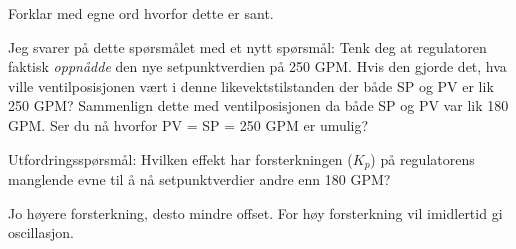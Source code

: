 Forklar med egne ord hvorfor dette er sant.







Jeg svarer på dette spørsmålet med et nytt spørsmål: Tenk deg at regulatoren faktisk {\it oppnådde} den nye setpunktverdien på 250 GPM. Hvis den gjorde det, hva ville ventilposisjonen vært i denne likevektstilstanden der både SP og PV er lik 250 GPM? Sammenlign dette med ventilposisjonen da både SP og PV var lik 180 GPM. Ser du nå hvorfor PV = SP = 250 GPM er umulig?

\vskip 10pt

Utfordringsspørsmål: Hvilken effekt har forsterkningen ($K_p$) på regulatorens manglende evne til å nå setpunktverdier andre enn 180 GPM?







Jo høyere forsterkning, desto mindre offset. For høy forsterkning vil imidlertid gi oscillasjon.


